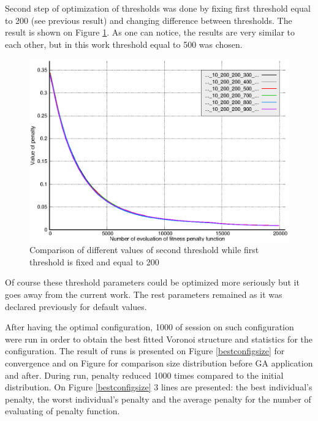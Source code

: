 \documentclass[12pt]{report}
\begin{document}
Second step of optimization of thresholds was done by fixing first threshold equal to 200 (see previous result) and changing difference between thresholds. The result is shown on Figure \ref{threshold2comparison}. As one can notice, the results are very similar to each other, but in this work threshold equal to 500 was chosen.

\begin{figure}
    \centering
    \includegraphics[width=5.0in]{threshold2_comparison}
    \caption{Comparison of different values of second threshold while first threshold is fixed and equal to 200}
    \label{threshold2comparison}
\end{figure}

Of course these threshold parameters could be optimized more seriously but it goes away from the current work. The rest parameters remained as it was declared previously for default values.

After having the optimal configuration, 1000 of session on such configuration were run in order to obtain the best fitted Voronoi structure and statistics for the configuration. The result of runs is presented on Figure \ref{bestconfigsize} for convergence and on Figure for comparison size distribution before GA application and after. During run, penalty reduced 1000 times compared to the initial distribution.
On Figure \ref{bestconfigsize} 3 lines are presented: the best individual's penalty, the worst individual's penalty and the average penalty for the number of evaluating of penalty function.
\end{document}
